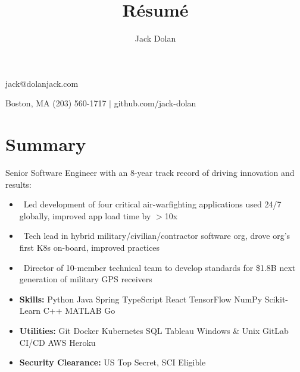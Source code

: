 \documentclass{article}
\makeatletter
\renewcommand{\maketitle}{ 
{\huge\bfseries\theauthor}\hfill jack@dolanjack.com 

\vspace{0.2em} 

Boston, MA \hfill (203) 560-1717 $|$ github.com/jack-dolan
}
\makeatother
\begin{document}
 
\title{R\'esum\'e} 
\author{Jack Dolan} 
\maketitle
{}


\section{Summary} 
Senior Software Engineer with an 8-year track record of driving innovation and results:
    \begin{itemize}
    \itemsep0em
    \item \ Led development of four critical air-warfighting applications used 24/7 globally, improved app load time by $>$10x
    \item \ Tech lead in hybrid military/civilian/contractor software org, drove org’s first K8s on-board, improved practices
    \item \ Director of 10-member technical team to develop standards for \$1.8B next generation of military GPS receivers
    \newline
    \item \textbf{Skills:} Python \text{\textbar} Java \text{\textbar} Spring \text{\textbar} TypeScript \text{\textbar} React \text{\textbar} TensorFlow \text{\textbar} NumPy \text{\textbar} Scikit-Learn \text{\textbar} C++ \text{\textbar} MATLAB \text{\textbar} Go
    \item \textbf{Utilities:} Git \text{\textbar} Docker \text{\textbar} Kubernetes \text{\textbar} SQL \text{\textbar} Tableau \text{\textbar} Windows \& Unix \text{\textbar} GitLab CI/CD \text{\textbar} AWS \text{\textbar} Heroku
    \item \textbf{Security Clearance:} US Top Secret, SCI Eligible \end{itemize} 

\end{document}
